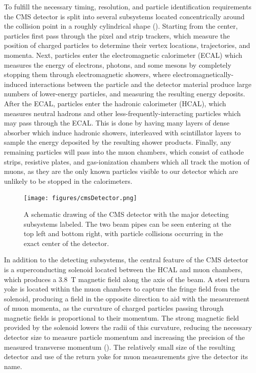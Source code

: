 To fulfill the necessary timing, resolution, and particle identification requirements the CMS detector is split into several subsystems located concentrically around the collision point in a roughly cylindrical shape (). 
Starting from the center, particles first pass through the pixel and strip trackers, which measure the position of charged particles to determine their vertex locations, trajectories, and momenta.
Next, particles enter the electromagnetic calorimeter (ECAL) which measures the energy of electrons, photons, and some mesons by completely stopping them through electromagnetic showers, where electromagnetically-induced interactions between the particle and the detector material produce large numbers of lower-energy particles, and measuring the resulting energy deposits.
After the ECAL, particles enter the hadronic calorimeter (HCAL), which measures neutral hadrons and other less-frequently-interacting particles which may pass through the ECAL. This is done by having many layers of dense absorber which induce hadronic showers, interleaved with scintillator layers to sample the energy deposited by the resulting shower products.
Finally, any remaining particles will pass into the muon chambers, which consist of cathode strips, resistive plates, and gas-ionization chambers which all track the motion of muons, as they are the only known particles visible to our detector which are unlikely to be stopped in the calorimeters.

\begin{figure}[htpb]
    \texttt{[image: figures/cmsDetector.png]}
    \centering
	\caption[The CMS Detector]{A schematic drawing of the CMS detector with the major detecting subsystems labeled. The two beam pipes can be seen entering at the top left and bottom right, with particle collisions occurring in the exact center of the detector.}
    \label{fig:detector}
\end{figure}

In addition to the detecting subsystems, the central feature of the CMS detector is a superconducting solenoid located between the HCAL and muon chambers, which produces a \SI{3.8}{\tesla} magnetic field along the axis of the beam. 
A steel return yoke is located within the muon chambers to capture the fringe field from the solenoid, producing a field in the opposite direction to aid with the measurement of muon momenta, as the curvature of charged particles passing through magnetic fields is proportional to their momentum. The strong magnetic field provided by the solenoid lowers the radii of this curvature, reducing the necessary detector size to measure particle momentum and increasing the precision of the measured transverse momentum (\pt). 
The relatively small size of the resulting detector and use of the return yoke for muon measurements give the detector its name.

